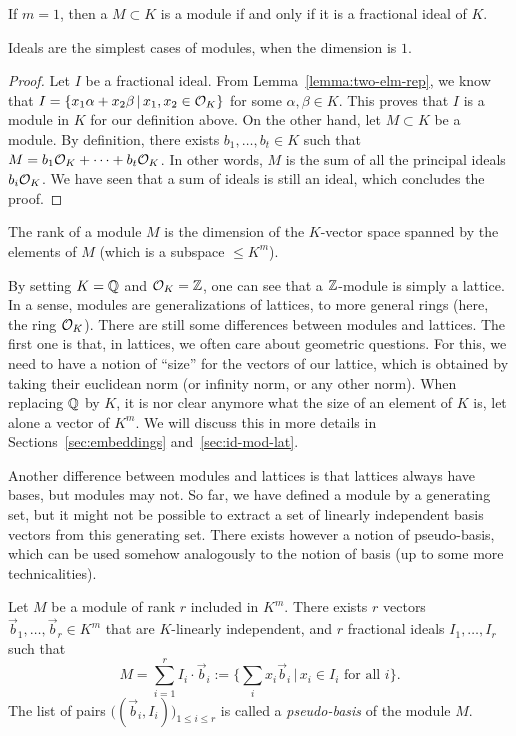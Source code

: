 \begin{lemma}
If $m = 1$, then a $M \subset K$ is a module if and only if it is a fractional ideal of $K$.
\end{lemma}
Ideals are the simplest cases of modules, when the dimension is $1$.

\begin{proof}
Let $I$ be a fractional ideal. From Lemma~\ref{lemma:two-elm-rep}, we know that $I = \{ x_1 \alpha + x_2 \beta \,|\, x_1, x_2 \in \mathcal{O}_K\}$ for some $\alpha, \beta \in K$. This proves that $I$ is a module in $K$ for our definition above.
On the other hand, let $M \subset K$ be a module. By definition, there exists $b_1, \dots, b_t \in K$ such that $M = b_1 \mathcal{O}_K + \dots + b_t \mathcal{O}_K$. In other words, $M$ is the sum of all the principal ideals $b_i \mathcal{O}_K$. We have seen that a sum of ideals is still an ideal, which concludes the proof.
\end{proof}

\begin{definition}
The rank of a module $M$ is the dimension of the $K$-vector space spanned by the elements of $M$ (which is a subspace $\leq K^m$).
\end{definition}

By setting $K = \mathbb{Q}$ and $\mathcal{O}_K = \mathbb{Z}$, one can see that a $\mathbb{Z}$-module is simply a lattice. In a sense, modules are generalizations of lattices, to more general rings (here, the ring $\mathcal{O}_K$). There are still some differences between modules and lattices. The first one is that, in lattices, we often care about geometric questions. For this, we need to have a notion of ``size'' for the vectors of our lattice, which is obtained by taking their euclidean norm (or infinity norm, or any other norm). When replacing $\mathbb{Q}$ by $K$, it is nor clear anymore what the size of an element of $K$ is, let alone a vector of $K^m$. We will discuss this in more details in Sections~\ref{sec:embeddings} and~\ref{sec:id-mod-lat}.

Another difference between modules and lattices is that lattices always have bases, but modules may not. So far, we have defined a module by a generating set, but it might not be possible to extract a set of linearly independent basis vectors from this generating set. There exists however a notion of pseudo-basis, which can be used somehow analogously to the notion of basis (up to some more technicalities).

\begin{lemma}
Let $M$ be a module of rank $r$ included in $K^m$. There exists $r$ vectors $\vec b_1, \dots, \vec b_r \in K^m$ that are $K$-linearly independent, and $r$ fractional ideals $I_1, \dots, I_r$ such that
\[ M = \sum_{i = 1}^r I_i \cdot \vec b_i := \{ \sum_i x_i \vec b_i \,|\, x_i \in I_i \text{ for all }i\}.\]
The list of pairs $\big((\vec b_i, I_i)\big)_{1 \leq i \leq r}$ is called a \emph{pseudo-basis} of the module $M$.
\end{lemma}

